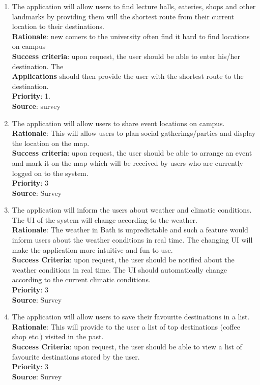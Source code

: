 \documentclass[10pt,a4paper,oneside]{report}
\begin{document}
{\begin{enumerate}
{  \textbf{Priority}: 1\\
  \textbf{Source}: survey.
}
\item{The application will allow users to find lecture halls, eateries, shops and other landmarks by providing them will the shortest route from their current location to their destinations. \\
  \textbf{Rationale}: new comers to the university often find it hard to find locations on campus\\
  \textbf{Success criteria}: upon request, the user should be able to enter his/her destination. The\\
  \textbf{Applications} should then provide the user with the shortest route to the destination.\\
  \textbf{Priority}: 1.\\
  \textbf{Source}: survey
}
\item{The application will allow users to share event locations on campus. \\
  \textbf{Rationale}: This will allow users to plan social gatherings/parties and display the location on the map.\\
  \textbf{Success criteria}: upon request, the user should be able to arrange an event and mark it on the map which will be received by users who are currently logged on to the system.\\
  \textbf{Priority}: 3\\
  \textbf{Source}: Survey
}

\item{The application will inform the users about weather and climatic conditions. The UI of the system will change according to the weather.\\
  \textbf{Rationale}: The weather in Bath is unpredictable and such a feature would inform users about the weather conditions in real time. The changing UI will make the application more intuitive and fun to use.\\
  \textbf{Success Criteria}: upon request, the user should be notified about the weather conditions in real time. The UI should automatically change according to the current climatic conditions.\\
  \textbf{Priority}: 3\\
  \textbf{Source}: Survey
}

\item{The application will allow users to save their favourite destinations in a list.\\
  \textbf{Rationale}: This will provide to the user a list of top destinations (coffee shop etc.) visited in the past.\\
  \textbf{Success Criteria}: upon request, the user should be able to view a list of favourite destinations stored by the user.\\
  \textbf{Priority}: 3\\
  \textbf{Source}: Survey
}


\end{enumerate}}
\end{document}
